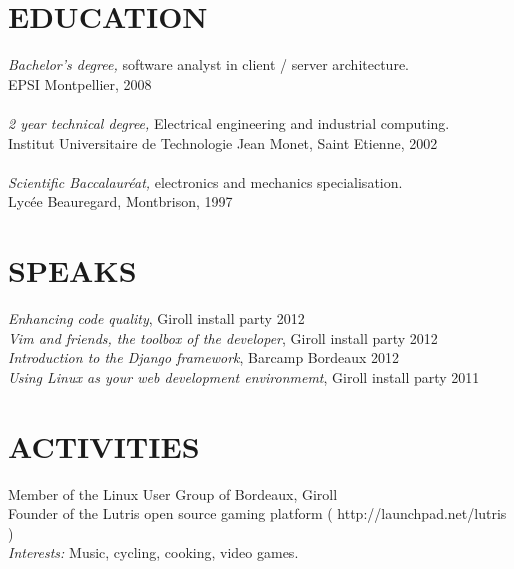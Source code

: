 \documentclass[margin]{res}
\begin{document}
\begin{resume}
\section{EDUCATION} {\sl Bachelor's degree,} software analyst in client / server architecture.\\
                	EPSI Montpellier, 2008\\ \\
		{\sl 2 year technical degree,} Electrical engineering and  industrial computing.\\
		Institut Universitaire de Technologie Jean Monet, Saint Etienne, 2002\\ \\
		{\sl Scientific Baccalaur\'{e}at,}  electronics and mechanics specialisation.\\
		Lyc\'{e}e Beauregard, Montbrison, 1997

\section{SPEAKS}
		{\sl Enhancing code quality}, Giroll install party \hfill     2012 \\
		{\sl Vim and friends, the toolbox of the developer}, Giroll install party \hfill     2012 \\
		{\sl Introduction to the Django framework}, Barcamp Bordeaux \hfill     2012 \\
		{\sl Using Linux as your web development environmemt}, Giroll install party \hfill     2011

\section{ACTIVITIES}
		Member of the Linux User Group of Bordeaux, Giroll \\
		Founder of the Lutris open source gaming platform ( http://launchpad.net/lutris )\\
		{\sl Interests:} Music, cycling, cooking, video games.
		

\end{resume}
\end{document}
